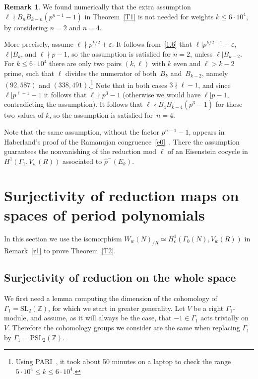 \documentclass{amsart}
\theoremstyle{plain}
\theoremstyle{definition}
\newtheorem{remark}[theorem]{Remark}
\numberwithin{equation}{section}
\newcommand{\Z}{{\mathbb Z}}
\def\le{\leqslant} \def\ge{\geqslant}
\def\SL{\mathrm{SL}} \def\PSL{\mathrm{PSL}}\def\GL{\mathrm{GL}}\def\PGL{\mathrm{PGL}}
\def\e{\varepsilon} \def\DD{\Delta} \def\G{\Gamma}\def\om{\omega}
\def\ov#1{\overline{#1}}
\renewcommand{\wr}{\widehat{\rho}}
\begin{document}
\begin{remark}\label{r2} We found numerically that the extra assumption 
$\ell\nmid B_nB_{k-n}(p^{n-1}-1)$ in Theorem~\ref{T1} is not needed for 
weights $k\le 6\cdot 10^4$, by considering $n=2$ and $n=4$. 

More precisely, assume $\ell\nmid p^{k/2}+\e$. It follows from~\eqref{1.6}
that $\ell|p^{k/2-1}+\e$, $\ell|B_k$, and $\ell\nmid p-1$, so  
the assumption is satisfied for $n=2$, unless $\ell|B_{k-2}$. For 
$k \le 6\cdot 10^4$ there are only two pairs $(k,\ell)$ with $k$ even 
and $\ell>k-2$ prime, such that $\ell$ divides the numerator of both~$B_k$ 
and~$B_{k-2}$, namely $(92, 587)$ and $(338,491)$.\footnote{Using PARI~\cite{Pari}, it took
about 50 minutes on a laptop to check the range $5\cdot 10^4\le k\le 6\cdot 10^4$.} 
Note that in both cases 
$3\nmid \ell-1$, and since $\ell|p^{\ell-1}-1$ it follows that $\ell\nmid p^3-1$ 
(otherwise we would have $\ell|p-1$, contradicting the assumption). It follows 
that $\ell\nmid B_4 B_{k-4}(p^3-1)$ for those two values of $k$, so the assumption 
is satisfied for~$n=4$.

Note that the same assumption, without the factor $p^{n-1}-1$, appears in 
Haberland's proof of the Ramanujan congruence~\eqref{e0}~\cite[Sec. 5.2]{H}. 
There the assumption guarantees the nonvanishing of the reduction mod $\ell$ of an 
Eisenstein cocycle in $H^1(\G_1, V_w(R))$ associated to
$\wr^-(E_{k})$. 
\end{remark}

\section{Surjectivity of reduction maps on spaces of period polynomials}\label{S4}

In this section we use the isomorphism $W_w(N)_{/R}\simeq H_c^1(\G_0(N),V_w(R))$ 
in Remark~\ref{r1} to prove Theorem~\ref{T2}. 

\subsection{Surjectivity of reduction on the whole space}
\label{s4.1}

We first need a lemma computing the dimension of the cohomology of $\G_1=\SL_2(\Z)$,
for which we start in greater generality. 
Let $V$ be a right $\G_1$-module, and assume, as it will always be the case, 
that $-1\in\G_1$ acts trivially on $V$. Therefore the cohomology groups we consider are the same when
replacing $\G_1$ by $\ov{\G}_1=\PSL_2(\Z)$.
\end{document}

